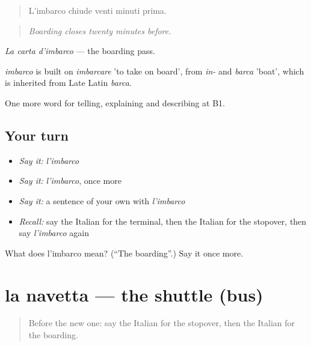 \begin{quote}
L'imbarco chiude venti minuti prima.
\end{quote}

\begin{quote}
\emph{Boarding closes twenty minutes before.}
\end{quote}

\emph{La carta d'imbarco} — the boarding pass.

\begin{cousinweb}
\emph{imbarco} is built on \emph{imbarcare} 'to take on board', from \emph{in-} and \emph{barca} 'boat', which is inherited from Late Latin \emph{barca}.
\end{cousinweb}

\begin{grammarlens}[title={What you've built}]
One more word for telling, explaining and describing at B1.
\end{grammarlens}

\subsection*{Your turn}
\begin{itemize}
\raggedright
  \item \emph{Say it:} \emph{l'imbarco}
  \item \emph{Say it:} \emph{l'imbarco}, once more
  \item \emph{Say it:} a sentence of your own with \emph{l'imbarco}
  \item \emph{Recall:} say the Italian for the terminal, then the Italian for the stopover, then say \emph{l'imbarco} again
\end{itemize}

\begin{tcolorbox}[breakable,colback=teal!4,colframe=teal!35!black,title={Before you move on}]
What does l'imbarco mean? (\textquotedblleft{}The boarding\textquotedblright{}.) Say it once more.
\end{tcolorbox}
\section[la navetta]{la navetta — the shuttle (bus)}

\label{lesson:IT-C425-navetta}



\begin{quote}
Before the new one: say the Italian for the stopover, then the Italian for the boarding.
\end{quote}

